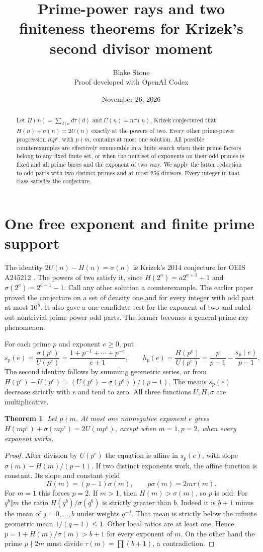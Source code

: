 \documentclass[11pt]{article}
\title{Prime-power rays and two finiteness theorems for Krizek's second divisor moment}
\author{Blake Stone\\\small Proof developed with OpenAI Codex}\date{November 26, 2026}
\newtheorem{theorem}{Theorem}\newtheorem{lemma}[theorem]{Lemma}
\begin{document}
\maketitle
\begin{abstract}
Let $H(n)=\sum_{d\mid n}d\tau(d)$ and $U(n)=n\tau(n)$. Krizek conjectured that $H(n)+\sigma(n)=2U(n)$ exactly at the powers of two. Every other prime-power progression $mp^e$, with $p\nmid m$, contains at most one solution. All possible counterexamples are effectively enumerable in a finite search when their prime factors belong to any fixed finite set, or when the multiset of exponents on their odd primes is fixed and all prime bases and the exponent of two vary. We apply the latter reduction to odd parts with two distinct primes and at most 256 divisors. Every integer in that class satisfies the conjecture.
\end{abstract}

\section{One free exponent and finite prime support}
The identity $2U(n)-H(n)=\sigma(n)$ is Krizek's 2014 conjecture for OEIS A245212 \cite{oeis}. The powers of two satisfy it, since $H(2^a)=a2^{a+1}+1$ and $\sigma(2^a)=2^{a+1}-1$. Call any other solution a counterexample. The earlier paper \cite{previous} proved the conjecture on a set of density one and for every integer with odd part at most $10^8$. It also gave a one-candidate test for the exponent of two and ruled out nontrivial prime-power odd parts. The former becomes a general prime-ray phenomenon.

For each prime $p$ and exponent $e\ge0$, put
\[
 s_p(e)=\frac{\sigma(p^e)}{U(p^e)}=\frac{1+p^{-1}+\cdots+p^{-e}}{e+1},
 \qquad h_p(e)=\frac{H(p^e)}{U(p^e)}=\frac p{p-1}-\frac{s_p(e)}{p-1}.
\]
The second identity follows by summing geometric series, or from $H(p^e)-U(p^e)=(U(p^e)-\sigma(p^e))/(p-1)$. The means $s_p(e)$ decrease strictly with $e$ and tend to zero. All three functions $U,H,\sigma$ are multiplicative.

\begin{theorem}\label{ray}
Let $p\nmid m$. At most one nonnegative exponent $e$ gives $H(mp^e)+\sigma(mp^e)=2U(mp^e)$, except when $m=1,p=2$, when every exponent works.
\end{theorem}
\begin{proof}
After division by $U(p^e)$ the equation is affine in $s_p(e)$, with slope $\sigma(m)-H(m)/(p-1)$. If two distinct exponents work, the affine function is constant. Its slope and constant yield
\[
 H(m)=(p-1)\sigma(m),\qquad p\sigma(m)=2m\tau(m).
\]
For $m=1$ this forces $p=2$. If $m>1$, then $H(m)>\sigma(m)$, so $p$ is odd. For $q^b\Vert m$ the ratio $H(q^b)/\sigma(q^b)$ is strictly greater than $b$. Indeed it is $b+1$ minus the mean of $j=0,\ldots,b$ under weights $q^{-j}$. That mean is strictly below the infinite geometric mean $1/(q-1)\le1$. Other local ratios are at least one. Hence $p=1+H(m)/\sigma(m)>b+1$ for every exponent of $m$. On the other hand the prime $p\nmid2m$ must divide $\tau(m)=\prod(b+1)$, a contradiction.
\end{proof}
\end{document}
